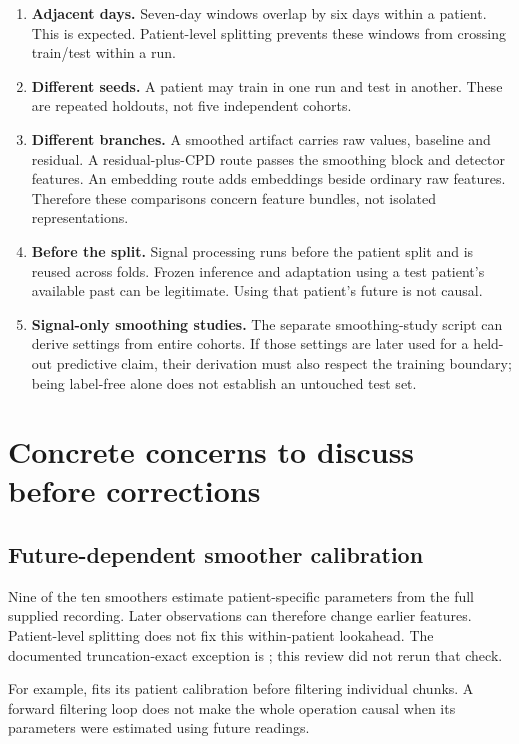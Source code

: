 \documentclass[11pt,a4paper]{article}
\newcommand{\code}[1]{\texttt{\detokenize{#1}}}
\begin{document}
\begin{enumerate}
\item \textbf{Adjacent days.} Seven-day windows overlap by six days within a patient.
This is expected. Patient-level splitting prevents these windows from crossing
train/test within a run.
\item \textbf{Different seeds.} A patient may train in one run and test in another.
These are repeated holdouts, not five independent cohorts.
\item \textbf{Different branches.} A smoothed artifact carries raw values, baseline
and residual. A residual-plus-CPD route passes the smoothing block and detector
features. An embedding route adds embeddings beside ordinary raw features.
Therefore these comparisons concern feature bundles, not isolated representations.
\item \textbf{Before the split.} Signal processing runs before the patient split and
is reused across folds. Frozen inference and adaptation using a test patient's
available past can be legitimate. Using that patient's future is not causal.
\item \textbf{Signal-only smoothing studies.} The separate smoothing-study script
can derive settings from entire cohorts. If those settings are later used for a
held-out predictive claim, their derivation must also respect the training boundary;
being label-free alone does not establish an untouched test set.
\end{enumerate}

\section{Concrete concerns to discuss before corrections}

\subsection{Future-dependent smoother calibration}
Nine of the ten smoothers estimate patient-specific parameters from the full supplied
recording. Later observations can therefore change earlier features. Patient-level
splitting does not fix this within-patient lookahead. The documented truncation-exact
exception is \code{anrewma}; this review did not rerun that check.

For example, \code{gammadglm} fits its patient calibration before filtering individual
chunks. A forward filtering loop does not make the whole operation causal when its
parameters were estimated using future readings.
\end{document}
